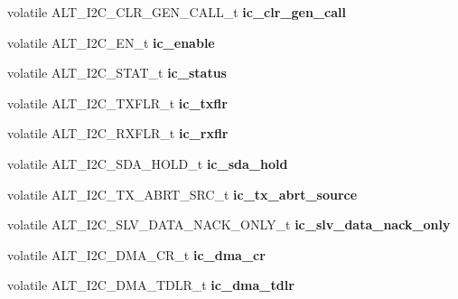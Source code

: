 \begin{DoxyCompactItemize}
volatile A\+L\+T\+\_\+\+I2\+C\+\_\+\+C\+L\+R\+\_\+\+G\+E\+N\+\_\+\+C\+A\+L\+L\+\_\+t {\bfseries ic\+\_\+clr\+\_\+gen\+\_\+call}
\item 
\mbox{\label{structALT__I2C__s_a0d0cd415a5f3844848b9d22960a174f7}} 
volatile A\+L\+T\+\_\+\+I2\+C\+\_\+\+E\+N\+\_\+t {\bfseries ic\+\_\+enable}
\item 
\mbox{\label{structALT__I2C__s_a8c7dc90d5910034094d2ec959d01dbc9}} 
volatile A\+L\+T\+\_\+\+I2\+C\+\_\+\+S\+T\+A\+T\+\_\+t {\bfseries ic\+\_\+status}
\item 
\mbox{\label{structALT__I2C__s_aef8adceb5e2e6ca7b1e91a3ab9ea3a66}} 
volatile A\+L\+T\+\_\+\+I2\+C\+\_\+\+T\+X\+F\+L\+R\+\_\+t {\bfseries ic\+\_\+txflr}
\item 
\mbox{\label{structALT__I2C__s_a31eeb8384f5ccf6ab787bb34689d0110}} 
volatile A\+L\+T\+\_\+\+I2\+C\+\_\+\+R\+X\+F\+L\+R\+\_\+t {\bfseries ic\+\_\+rxflr}
\item 
\mbox{\label{structALT__I2C__s_abadf4ec9fc99e4ad13f58f93254a1dee}} 
volatile A\+L\+T\+\_\+\+I2\+C\+\_\+\+S\+D\+A\+\_\+\+H\+O\+L\+D\+\_\+t {\bfseries ic\+\_\+sda\+\_\+hold}
\item 
\mbox{\label{structALT__I2C__s_a0888f855b2fd9011d7c2efcef3f51c53}} 
volatile A\+L\+T\+\_\+\+I2\+C\+\_\+\+T\+X\+\_\+\+A\+B\+R\+T\+\_\+\+S\+R\+C\+\_\+t {\bfseries ic\+\_\+tx\+\_\+abrt\+\_\+source}
\item 
\mbox{\label{structALT__I2C__s_a88e3f491176eb599453ec0cef668a498}} 
volatile A\+L\+T\+\_\+\+I2\+C\+\_\+\+S\+L\+V\+\_\+\+D\+A\+T\+A\+\_\+\+N\+A\+C\+K\+\_\+\+O\+N\+L\+Y\+\_\+t {\bfseries ic\+\_\+slv\+\_\+data\+\_\+nack\+\_\+only}
\item 
\mbox{\label{structALT__I2C__s_a7af7501026a17afc29c1f1ec8017a1e5}} 
volatile A\+L\+T\+\_\+\+I2\+C\+\_\+\+D\+M\+A\+\_\+\+C\+R\+\_\+t {\bfseries ic\+\_\+dma\+\_\+cr}
\item 
\mbox{\label{structALT__I2C__s_a136de8a5f8a16fca95396069c969e4e2}} 
volatile A\+L\+T\+\_\+\+I2\+C\+\_\+\+D\+M\+A\+\_\+\+T\+D\+L\+R\+\_\+t {\bfseries ic\+\_\+dma\+\_\+tdlr}

\end{DoxyCompactItemize}
